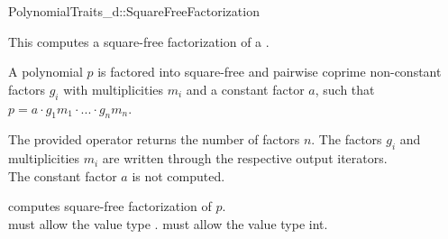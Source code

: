 \begin{ccRefConcept}{PolynomialTraits_d::SquareFreeFactorization}

\ccDefinition

This  computes a square-free factorization 
of a . 

A polynomial $p$ is factored into square-free and pairwise coprime non-constant
factors $g_i$ with multiplicities $m_i$ and a constant factor $a$, such that 
$p = a  \cdot  g_1m_1  \cdot  ...  \cdot  g_nm_n$.

The provided operator returns the number of factors $n$.
The factors $g_i$ and 
multiplicities $m_i$ are written through the respective output iterators.\\
The constant factor $a$ is not computed. 
          
\ccRefines 

\ccTypes
{}

\ccOperations

{ computes square-free factorization of $p$.\\
  \ccPrecond {} must allow the value type 
  . 
  \ccPrecond {} must allow the value type int.
}


\ccSeeAlso

\\
\\
\\
\\

\end{ccRefConcept}
